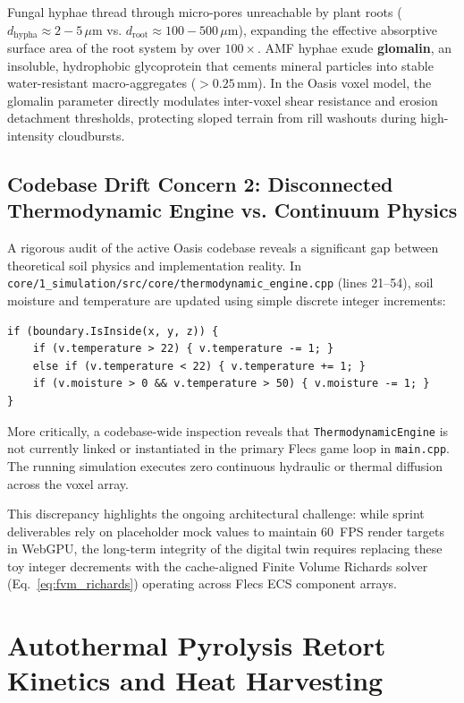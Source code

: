 Fungal hyphae thread through micro-pores unreachable by plant roots ($d_{\mathrm{hypha}} \approx 2 - 5\,\mu\mathrm{m}$ vs. $d_{\mathrm{root}} \approx 100 - 500\,\mu\mathrm{m}$), expanding the effective absorptive surface area of the root system by over $100\times$. AMF hyphae exude \textbf{glomalin}, an insoluble, hydrophobic glycoprotein that cements mineral particles into stable water-resistant macro-aggregates ($>0.25\,\mathrm{mm}$). In the Oasis voxel model, the glomalin parameter directly modulates inter-voxel shear resistance and erosion detachment thresholds, protecting sloped terrain from rill washouts during high-intensity cloudbursts.

\subsection{Codebase Drift Concern 2: Disconnected Thermodynamic Engine vs. Continuum Physics}
A rigorous audit of the active Oasis codebase reveals a significant gap between theoretical soil physics and implementation reality. In \texttt{core/1\_simulation/src/core/thermodynamic\_engine.cpp} (lines 21--54), soil moisture and temperature are updated using simple discrete integer increments:
\begin{verbatim}
if (boundary.IsInside(x, y, z)) {
    if (v.temperature > 22) { v.temperature -= 1; }
    else if (v.temperature < 22) { v.temperature += 1; }
    if (v.moisture > 0 && v.temperature > 50) { v.moisture -= 1; }
}
\end{verbatim}
More critically, a codebase-wide inspection reveals that \texttt{ThermodynamicEngine} is not currently linked or instantiated in the primary Flecs game loop in \texttt{main.cpp}. The running simulation executes zero continuous hydraulic or thermal diffusion across the voxel array.

This discrepancy highlights the ongoing architectural challenge: while sprint deliverables rely on placeholder mock values to maintain 60~FPS render targets in WebGPU, the long-term integrity of the digital twin requires replacing these toy integer decrements with the cache-aligned Finite Volume Richards solver (Eq.~\ref{eq:fvm_richards}) operating across Flecs ECS component arrays.

\section{Autothermal Pyrolysis Retort Kinetics and Heat Harvesting}
\label{sec:pyrolysis_kinetics}

